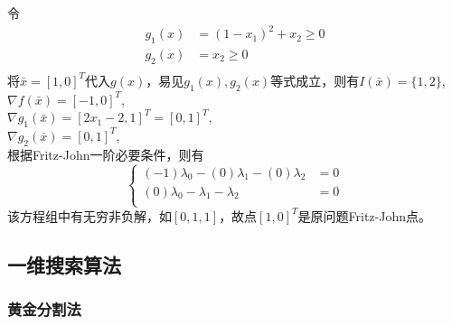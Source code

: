 \begin{solution}
    令
    \begin{align*}
        g_1(x)&=(1 - x_1)^2 + x_2\geq 0\\
        g_2(x)&=x_2\geq0\\
    \end{align*}
    将$\bar{x}=[1,0]^T$代入$g(x)$，易见$g_1(x),g_2(x)$等式成立，则有$I(\bar{x})=\{1,2\}$,\\
    $\nabla f(\bar{x})=[-1,0]^T$,\\
    $\nabla g_1(\bar{x})=[2x_1-2,1]^T=[0,1]^T$,\\
    $\nabla g_2(\bar{x})=[0,1]^T$,\\
    根据Fritz-John一阶必要条件，则有
    $$\left\{
    \begin{aligned}
        (-1)\lambda_0 - (0)\lambda_1 - (0)\lambda_2 &=0\\
        (0)\lambda_0 - \lambda_1 - \lambda_2 &=0\\
    \end{aligned}\right.$$
    该方程组中有无穷非负解，如$[0,1,1]$，故点$[1,0]^T$是原问题Fritz-John点。
\end{solution}

\subsection{一维搜索算法}

\subsubsection{黄金分割法}

